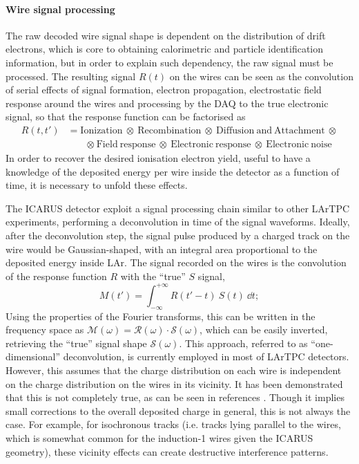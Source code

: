 \paragraph{Wire signal processing} The raw decoded wire signal shape is dependent on the distribution of drift electrons, which is core to obtaining calorimetric and particle identification information, but in order to explain such dependency, the raw signal must be processed. The resulting signal $R(t)$ on the wires can be seen as the convolution of serial effects of signal formation, electron propagation, electrostatic field response around the wires and processing by the DAQ to the true electronic signal, so that the response function can be factorised as \begin{equation}
    \begin{aligned}
        R(t, t')&=\mathrm{Ionization\ \otimes\ Recombination\ \otimes\ Diffusion\ and\ Attachment\ \otimes} \\
        &\quad \quad \mathrm{\otimes\ Field\ response\ \otimes\ Electronic\ response\ \otimes\ Electronic\ noise}
    \end{aligned} 
\end{equation} In order to recover the desired ionisation electron yield, useful to have a knowledge of the deposited energy per wire inside the detector as a function of time, it is necessary to unfold these effects. 

The ICARUS detector exploit a signal processing chain similar to other LArTPC experiments, performing a deconvolution in time of the signal waveforms. Ideally, after the deconvolution step, the signal pulse produced by a charged track on the wire would be Gaussian-shaped, with an integral area proportional to the deposited energy inside LAr. The signal recorded on the wires is the convolution of the response function $R$ with the ``true'' $S$ signal, \begin{equation}
    M(t') = \int_{-\infty}^{+\infty} R(t'-t)\ S(t)\ \dd t;
\end{equation} Using the properties of the Fourier transforms, this can be written in the frequency space as $\mathcal M(\omega) = \mathcal R(\omega)\cdot \mathcal S(\omega)$, which can be easily inverted, retrieving the ``true'' signal shape $\mathcal S(\omega)$. This approach, referred to as ``one-dimensional'' deconvolution, is currently employed in most of LArTPC detectors. However, this assumes that the charge distribution on each wire is independent on the charge distribution on the wires in its vicinity. It has been demonstrated that this is not completely true, as can be seen in references \cite{MicroBooNE:2018swd,MicroBooNE:2018vro}. Though it implies small corrections to the overall deposited charge in general, this is not always the case. For example, for isochronous tracks (i.e. tracks lying parallel to the wires, which is somewhat common for the induction-1 wires given the ICARUS geometry), these vicinity effects can create destructive interference patterns.

